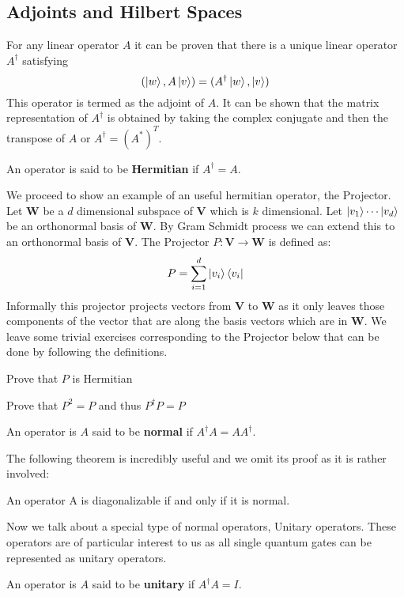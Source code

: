 \subsection{Adjoints and Hilbert Spaces}

For any linear operator $A$ it can be proven that there is a unique linear operator $A^{\dagger}$ satisfying 
$$ (\ket{w}, A\ket{v}) = (A^{\dagger}\ket{w}, \ket{v})$$
This operator is termed as the adjoint of $A$.
It can be shown that the matrix representation of $A^\dagger$ is obtained by taking the complex conjugate and then the transpose of $A$ or $A^\dagger = (A^*)^T$.

\begin{definition}
An operator is said to be \textbf{Hermitian} if $A^\dagger = A$.
\end{definition}
We proceed to show an example of an useful hermitian operator, the Projector.
Let $\textbf{W}$ be a $d$ dimensional subspace of $\textbf{V}$ which is $k$ dimensional. Let $\ket{v_1} \cdots \ket{v_d}$ be an orthonormal basis of $\textbf{W}$. By Gram Schmidt process we can extend this to an orthonormal basis of $\textbf{V}$.
The Projector $P: \textbf{V} \rightarrow \textbf{W}$ is defined as:
$$P = \sum_{i=1}^{d} \ket{v_i}\bra{v_i}$$
Informally this projector projects vectors from $\textbf{V}$ to $\textbf{W}$ as it only leaves those components of the vector that are along the basis vectors which are in $\textbf{W}$. We leave some trivial exercises corresponding to the Projector below that can be done by following the definitions.

\begin{exercise}
Prove that $P$ is Hermitian
\end{exercise}
\begin{exercise}
Prove that $P^2 = P$ and thus $P^\dagger P = P$
\end{exercise}
\begin{definition}
An operator is $A$ said to be \textbf{normal} if $A^\dagger A  = AA^\dagger$.
\end{definition}
The following theorem is incredibly useful and we omit its proof as it is rather involved:
\begin{theorem} An operator A is diagonalizable if and only if it is normal.
\end{theorem}

Now we talk about a special type of normal operators, Unitary operators. These operators are of particular interest to us as all single quantum gates can be represented as unitary operators. 
\begin{definition}
An operator is $A$ said to be \textbf{unitary} if $A^\dagger A  = I$.
\end{definition}

